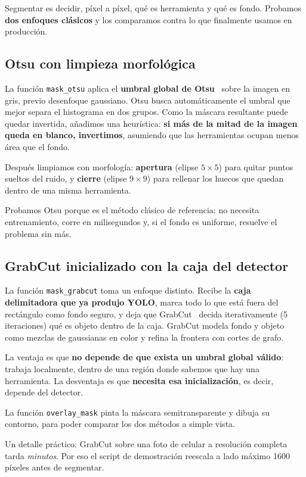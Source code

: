 \documentclass[11pt,a4paper]{article}
\begin{document}
Segmentar es decidir, píxel a píxel, qué es herramienta y qué es fondo. Probamos \textbf{dos
enfoques clásicos} y los comparamos contra lo que finalmente usamos en producción.

\subsection{Otsu con limpieza morfológica}

La función \texttt{mask\_otsu} aplica el \textbf{umbral global de Otsu}~\cite{otsu} sobre la imagen
en gris, previo desenfoque gaussiano. Otsu busca automáticamente el umbral que mejor separa el
histograma en dos grupos. Como la máscara resultante puede quedar invertida, añadimos una
heurística: \textbf{si más de la mitad de la imagen queda en blanco, invertimos}, asumiendo que las
herramientas ocupan menos área que el fondo.

Después limpiamos con morfología: \textbf{apertura} (elipse $5\times5$) para quitar puntos sueltos
del ruido, y \textbf{cierre} (elipse $9\times9$) para rellenar los huecos que quedan dentro de una
misma herramienta.

Probamos Otsu porque es el método clásico de referencia: no necesita entrenamiento, corre en
milisegundos y, si el fondo es uniforme, resuelve el problema sin más.

\subsection{GrabCut inicializado con la caja del detector}

La función \texttt{mask\_grabcut} toma un enfoque distinto. Recibe la \textbf{caja delimitadora que
ya produjo YOLO}, marca todo lo que está fuera del rectángulo como fondo seguro, y deja que
GrabCut~\cite{grabcut} decida iterativamente (5 iteraciones) qué es objeto dentro de la caja.
GrabCut modela fondo y objeto como mezclas de gaussianas en color y refina la frontera con cortes
de grafo.

La ventaja es que \textbf{no depende de que exista un umbral global válido}: trabaja localmente,
dentro de una región donde sabemos que hay una herramienta. La desventaja es que \textbf{necesita
esa inicialización}, es decir, depende del detector.

La función \texttt{overlay\_mask} pinta la máscara semitransparente y dibuja su contorno, para
poder comparar los dos métodos a simple vista.

Un detalle práctico: GrabCut sobre una foto de celular a resolución completa tarda \emph{minutos}.
Por eso el script de demostración reescala a lado máximo 1600 píxeles antes de segmentar.
\end{document}
